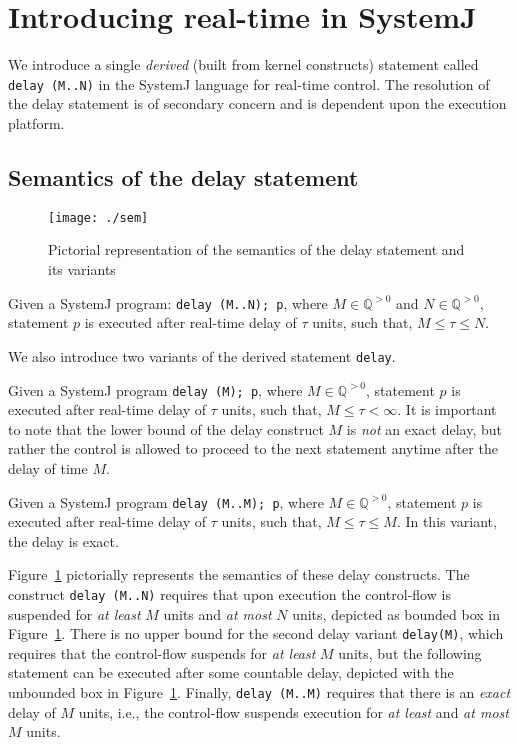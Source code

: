 \section{Introducing real-time in SystemJ}
\label{sec:intr-real-time}

We introduce a single \textit{derived} (built from kernel constructs)
statement called \mbox{\texttt{delay (M..N)}} in the SystemJ language
for real-time control. The resolution of the delay statement is of
secondary concern and is dependent upon the execution platform. 


\subsection{Semantics of the delay statement}
\label{sec:semant-delay-stat}

\begin{figure}[t!]
  \centering
  \texttt{[image: ./sem]}
  \caption{Pictorial representation of the semantics of the delay
    statement and its variants}
  \label{fig:5}
\end{figure}

Given a SystemJ program: \texttt{delay (M..N); p}, where $M \in
\mathbb{Q}^{>0}$ and $N \in \mathbb{Q}^{>0}$, statement $p$ is executed
after real-time delay of $\tau$ units, such that, $M \leq \tau \leq N$.

We also introduce two variants of the derived statement \texttt{delay}.
\begin{enumerate*}
\item Given a SystemJ program \texttt{delay (M); p}, where $M \in
  \mathbb{Q}^{>0}$, statement $p$ is executed after real-time delay of
  $\tau$ units, such that, $M \leq \tau < \infty$. It is important to
  note that the lower bound of the delay construct $M$ is \textit{not}
  an exact delay, but rather the control is allowed to proceed to the
  next statement anytime after the delay of time $M$.
\item Given a SystemJ program \texttt{delay (M..M); p}, where $M \in
  \mathbb{Q}^{>0}$, statement $p$ is executed after real-time delay of
  $\tau$ units, such that, $M \leq \tau \leq M$. In this variant, the
  delay is exact.
\end{enumerate*}

Figure~\ref{fig:5} pictorially represents the semantics of these delay
constructs. The construct \texttt{delay (M..N)} requires that upon
execution the control-flow is suspended for \textit{at least} $M$ units
and \textit{at most} $N$ units, depicted as bounded box in
Figure~\ref{fig:5}. There is no upper bound for the second delay variant
\texttt{delay(M)}, which requires that the control-flow suspends for
\textit{at least} $M$ units, but the following statement can be executed
after some countable delay, depicted with the unbounded box in
Figure~\ref{fig:5}. Finally, \texttt{delay (M..M)} requires that there
is an \textit{exact} delay of $M$ units, i.e., the control-flow suspends
execution for \textit{at least} and \textit{at most} $M$ units.

